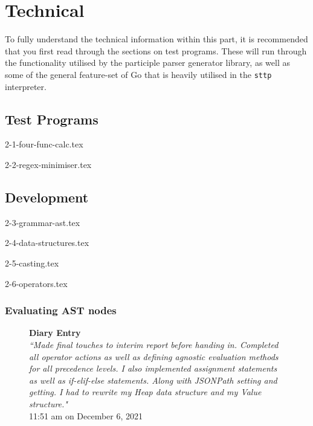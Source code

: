 \documentclass[]{full}
\theoremstyle{definition}
\begin{document}
\part{Technical}

To fully understand the technical information within this part, it is recommended that you first read through the sections on test programs. These will run through the functionality utilised by the participle parser generator library, as well as some of the general feature-set of Go that is heavily utilised in the \verb|sttp| interpreter.

\chapter{Test Programs}
\label{chap:test-programs}

{2-1-four-func-calc.tex}

{2-2-regex-minimiser.tex}

\chapter{Development}
\label{chap:development}

{2-3-grammar-ast.tex}

{2-4-data-structures.tex}

{2-5-casting.tex}

{2-6-operators.tex}

\section{Evaluating AST nodes}

\begin{figure}[H]
    \begin{center}
        \textbf{Diary Entry}\\[0.5em]
        \textit{``Made final touches to interim report before handing in. Completed all operator actions as well as defining agnostic evaluation methods for all precedence levels. I also implemented assignment statements as well as if-elif-else statements. Along with JSONPath setting and getting. I had to rewrite my Heap data structure and my Value structure."}\\[0.5em]
        \tiny{11:51 am on December 6, 2021}
    \end{center}
\end{figure}
    
\end{document}
